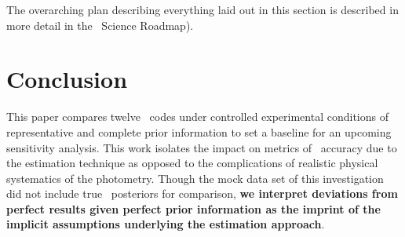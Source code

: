 
The overarching plan describing everything laid out in this section is described in more detail in the \desc\ Science Roadmap).

\section{Conclusion}

This paper compares twelve \pzpdf\ codes under controlled experimental conditions of representative and complete prior information to set a baseline for an upcoming sensitivity analysis.
This work isolates the impact on metrics of \pzpdf\ accuracy due to the estimation technique as opposed to the complications of realistic physical systematics of the photometry.
Though the mock data set of this investigation did not include true \pz\ posteriors for comparison, \textbf{we interpret deviations from perfect results given perfect prior information as the imprint of the implicit assumptions underlying the estimation approach}.

